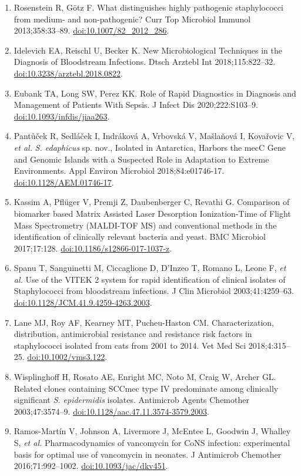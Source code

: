 \documentclass[
]{book}
\begin{document}
\begin{enumerate}
\item
  Rosenstein R, Götz F. What distinguishes highly pathogenic staphylococci from medium- and non-pathogenic? Curr Top Microbiol Immunol 2013;358:33--89. \url{doi:10.1007/82_2012_286}.
\item
  Idelevich EA, Reischl U, Becker K. New Microbiological Techniques in the Diagnosis of Bloodstream Infections. Dtsch Arztebl Int 2018;115:822--32. \url{doi:10.3238/arztebl.2018.0822}.
\item
  Eubank TA, Long SW, Perez KK. Role of Rapid Diagnostics in Diagnosis and Management of Patients With Sepsis. J Infect Dis 2020;222:S103--9. \url{doi:10.1093/infdis/jiaa263}.
\item
  Pantůček R, Sedláček I, Indráková A, Vrbovská V, Mašlaňová I, Kovařovic V, \emph{et al.} \emph{S. edaphicus} sp. nov., Isolated in Antarctica, Harbors the mecC Gene and Genomic Islands with a Suspected Role in Adaptation to Extreme Environments. Appl Environ Microbiol 2018;84:e01746-17. \url{doi:10.1128/AEM.01746-17}.
\item
  Kassim A, Pflüger V, Premji Z, Daubenberger C, Revathi G. Comparison of biomarker based Matrix Assisted Laser Desorption Ionization-Time of Flight Mass Spectrometry (MALDI-TOF MS) and conventional methods in the identification of clinically relevant bacteria and yeast. BMC Microbiol 2017;17:128. \url{doi:10.1186/s12866-017-1037-z}.
\item
  Spanu T, Sanguinetti M, Ciccaglione D, D'Inzeo T, Romano L, Leone F, \emph{et al.} Use of the VITEK 2 system for rapid identification of clinical isolates of Staphylococci from bloodstream infections. J Clin Microbiol 2003;41:4259--63. \url{doi:10.1128/JCM.41.9.4259-4263.2003}.
\item
  Lane MJ, Roy AF, Kearney MT, Pucheu-Haston CM. Characterization, distribution, antimicrobial resistance and resistance risk factors in staphylococci isolated from cats from 2001 to 2014. Vet Med Sci 2018;4:315--25. \url{doi:10.1002/vms3.122}.
\item
  Wisplinghoff H, Rosato AE, Enright MC, Noto M, Craig W, Archer GL. Related clones containing SCCmec type IV predominate among clinically significant \emph{S. epidermidis} isolates. Antimicrob Agents Chemother 2003;47:3574--9. \url{doi:10.1128/aac.47.11.3574-3579.2003}.
\item
  Ramos-Martín V, Johnson A, Livermore J, McEntee L, Goodwin J, Whalley S, \emph{et al.} Pharmacodynamics of vancomycin for CoNS infection: experimental basis for optimal use of vancomycin in neonates. J Antimicrob Chemother 2016;71:992--1002. \url{doi:10.1093/jac/dkv451}.

\end{enumerate}
\end{document}
